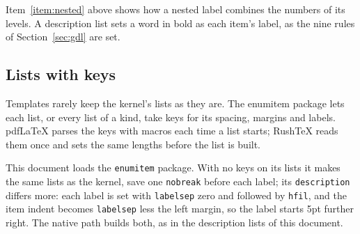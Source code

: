\documentclass{article}
\numberwithin{equation}{section}
\theoremstyle{definition}
\theoremstyle{remark}
\begin{document}
Item~\ref{item:nested} above shows how a nested label combines the numbers of its
levels. A description list sets a word in bold as each item's label, as the nine rules
of Section~\ref{sec:gdl} are set.

\subsection{Lists with keys}\label{sec:enumitem}
Templates rarely keep the kernel's lists as they are. The enumitem package lets each list,
or every list of a kind, take keys for its spacing, margins and labels. pdfLaTeX parses the
keys with macros each time a list starts; RushTeX reads them once and sets the same
lengths before the list is built.

This document loads the \texttt{enumitem} package. With no keys on its lists it makes the
same lists as the kernel, save one \texttt{nobreak} before each label; its
\texttt{description} differs more: each label is set with \texttt{labelsep} zero and
followed by \texttt{hfil}, and the item indent becomes \texttt{labelsep} less the left
margin, so the label starts 5pt further right. The native path builds both, as in the
description lists of this document.
\end{document}
